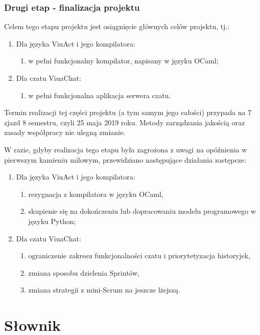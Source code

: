 \documentclass[11pt,oneside,a4paper,titlepage,onecolumn]{article}
\begin{document}
\subsubsection{Drugi etap - finalizacja projektu}

Celem tego etapu projektu jest osiągnięcie głównych celów projektu, tj.:
\begin{enumerate}
	\item Dla języka ViuAct i jego kompilatora:
		\begin{enumerate}
			\item w pełni funkcjonalny kompilator, napisany w języku OCaml;
		\end{enumerate}
	\item Dla czatu ViuaChat:
		\begin{enumerate}
			\item w pełni funkcjonalna aplikacja serwera czatu.
		\end{enumerate}
\end{enumerate}
Termin realizacji tej części projektu (a tym samym jego całości) przypada na 7 zjazd 8 semestru, czyli 25 
maja 2019 roku. Metody zarządzania jakością oraz zasady współpracy nie ulegną zmianie.

W razie, gdyby realizacja tego etapu była zagrożona z uwagi na opóźnienia w pierwszym kamieniu milowym,
przewidziano następujące działania zastępcze:

\begin{enumerate}
	\item Dla języka ViuAct i jego kompilatora:
		\begin{enumerate}
			\item rezygnacja z kompilatora w języku OCaml,
			\item skupienie się na dokończeniu lub dopracowaniu modelu programowego w języku Python;
		\end{enumerate}
	\item Dla czatu ViuaChat:
		\begin{enumerate}
			\item ograniczenie zakresu funkcjonalności czatu i priorytetyzacja historyjek,
			\item zmiana sposobu dzielenia Sprintów,
			\item zmiana strategii z mini-Scrum na jeszcze lżejszą.
		\end{enumerate}
\end{enumerate}

\section{Słownik}
\end{document}
